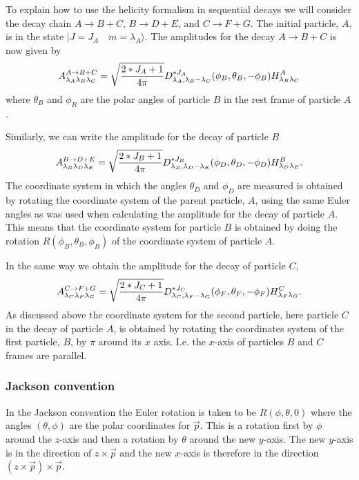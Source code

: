 To explain how to use the helicity formalism in sequential decays 
we will consider the decay chain $A\rightarrow B+C$, $B\rightarrow D+E$, 
and $C\rightarrow F+G$. The initial particle, $A$, is in the 
state $|J=J_A\quad m=\lambda_A\rangle$. The amplitudes for
the decay $A\rightarrow B+C$ is now given by
\begin{equation}
A^{A\rightarrow B+C}_{\lambda_A\lambda_B\lambda_C}=
\sqrt{2*J_A+1\over 4\pi} D^{*J_A}_{\lambda_A,\lambda_B-\lambda_C}
(\phi_B,\theta_B,-\phi_B)H^{A}_{\lambda_B\lambda_C}
\end{equation}
where $\theta_B$ and $\phi_B$ are the polar angles of particle
$B$ in the rest frame of particle $A$. 

Similarly, we can write the amplitude for the decay of particle $B$
\begin{equation}
A^{B\rightarrow D+E}_{\lambda_B\lambda_D\lambda_E}=
\sqrt{2*J_B+1\over 4\pi} D^{*J_B}_{\lambda_B,\lambda_D-\lambda_E}
(\phi_D,\theta_D,-\phi_D)H^{B}_{\lambda_D\lambda_E}.
\end{equation}
The coordinate system in which the angles $\theta_D$ and $\phi_D$
are measured is obtained by rotating the coordinate system of the
parent particle, $A$, using the same Euler angles as was used
when calculating the amplitude for the decay of particle $A$.
This means that the coordinate system for particle $B$ is obtained
by doing the rotation $R(\phi_B,\theta_B,\phi_B)$ of the 
coordinate system of particle $A$.

In the same way we obtain the amplitude for the decay of particle
$C$,
\begin{equation}
A^{C\rightarrow F+G}_{\lambda_C\lambda_F\lambda_G}=
\sqrt{2*J_C+1\over 4\pi} D^{*J_C}_{\lambda_C,\lambda_F-\lambda_G}
(\phi_F,\theta_F,-\phi_F)H^{C}_{\lambda_F\lambda_G}.
\end{equation}
As discussed above the coordinate system for the second particle,
here particle $C$ in the decay of particle $A$, is obtained by rotating
the coordinates system of the first particle, $B$, by $\pi$ around
its $x$ axis. I.e. the $x$-axis of particles $B$ and $C$ frames are
parallel. 

\subsubsection{Jackson convention}

In the Jackson convention the Euler rotation is taken to be
$R(\phi,\theta,0)$ where the angles $(\theta,\phi)$ are the 
polar coordinates for $\vec p$. This is a 
rotation first by $\phi$ around the 
$z$-axis and then a rotation by $\theta$ around the new $y$-axis.
The new $y$-axis is in the direction of $z\times \vec p$ and 
the new $x$-axis is therefore in the direction $(z\times \vec p)\times \vec p$.

